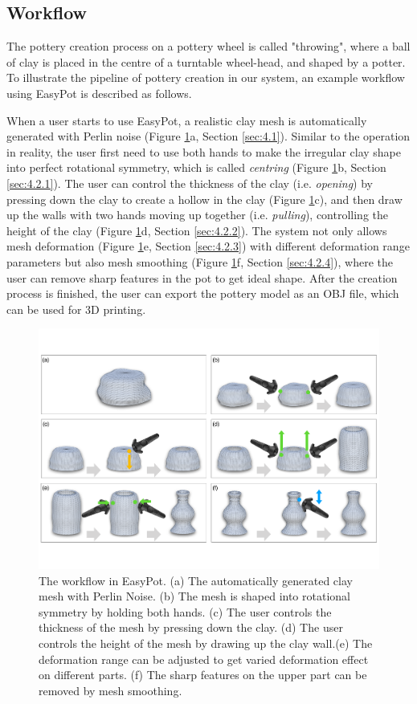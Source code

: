 \documentclass{svjour3}                     %
\begin{document}
\subsection{Workflow}
\label{sec:3.2}
The pottery creation process on a pottery wheel is called "throwing", where a ball of clay is placed in the centre of a turntable wheel-head, and shaped by a potter.
To illustrate the pipeline of pottery creation in our system, an example workflow using EasyPot is described as follows.

When a user starts to use EasyPot, a realistic clay mesh is automatically generated with Perlin noise (Figure \ref{fig:workflow}a, Section \ref{sec:4.1}). 
Similar to the operation in reality, the user first need to use both hands to make the irregular clay shape into perfect rotational symmetry, which is called \textit{centring} (Figure \ref{fig:workflow}b, Section \ref{sec:4.2.1}).
The user can control the thickness of the clay (i.e. \textit{opening}) by pressing down the clay to create a hollow in the clay (Figure \ref{fig:workflow}c), 
and then draw up the walls with two hands moving up together (i.e. \textit{pulling}), controlling the height of the clay (Figure \ref{fig:workflow}d, Section \ref{sec:4.2.2}).
The system not only allows mesh deformation (Figure \ref{fig:workflow}e, Section \ref{sec:4.2.3}) with different deformation range parameters but also mesh smoothing (Figure \ref{fig:workflow}f, Section \ref{sec:4.2.4}), where the user can remove sharp features in the pot to get ideal shape.
After the creation process is finished, the user can export the pottery model as an OBJ file, which can be used for 3D printing.

\begin{figure}
\includegraphics[width=\textwidth]{workflow.pdf}
\caption{The workflow in EasyPot. (a) The automatically generated clay mesh with Perlin Noise. (b) The mesh is shaped into rotational symmetry by holding both hands. (c) The user controls the thickness of the mesh by pressing down the clay. (d) The user controls the height of the mesh by drawing up the clay wall.(e) The deformation range can be adjusted to get varied deformation effect on different parts. (f) The sharp features on the upper part can be removed by mesh smoothing.}
\label{fig:workflow}
\end{figure}
\end{document}
